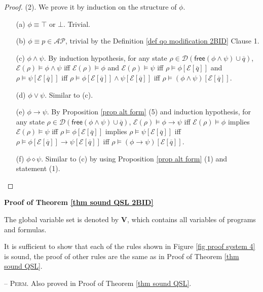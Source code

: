 \documentclass[conference,compsoc, 10pt]{IEEEtran}
\newcommand {\qbar} {{\overline{q}}}
\newcommand {\cD } {{\mathcal{D}}}
\newcommand {\cE } {{\mathcal{E}}}
\newcommand {\free }[1] {{\mathsf{free}\left(#1\right)}}
\newcommand {\vars } {\mathbf{V}}
\newcommand {\AP} {{\mathcal{AP}}}
\newcommand{\sd}{\diamond}%
\begin{document}
\begin{appendices}
\begin{proof}
			\noindent	(2). We prove it by induction on the structure of $\phi$.
			\begin{enumerate}
				\item[(a)] $\phi\equiv\top$ or $\bot$. Trivial.
				\item[(b)] $\phi\equiv p\in\AP$, trivial by the Definition \ref{def qo modification 2BID} Clause 1.
				\item[(c)] $\phi\wedge\psi$. By induction hypothesis, for any state $\rho\in\cD(\free{\phi\wedge\psi}\cup\qbar)$, $\cE(\rho)\models\phi\wedge\psi$ iff $\cE(\rho)\models\phi$ and $\cE(\rho)\models\psi$ iff $\rho\models \phi[\cE[\qbar]]$ and $\rho\models \psi[\cE[\qbar]]$ iff $\rho\models \phi[\cE[\qbar]]\wedge\psi[\cE[\qbar]]$ iff $\rho\models (\phi\wedge\psi)[\cE[\qbar]]$.
				\item[(d)] $\phi\vee\psi$. Similar to (c).
				\item[(e)] $\phi\rightarrow\psi$. By Proposition \ref{prop alt form} (5) and induction hypothesis, for any state $\rho\in\cD(\free{\phi\wedge\psi}\cup\qbar)$, $\cE(\rho)\models\phi\rightarrow\psi$ iff $\cE(\rho)\models\phi$ implies $\cE(\rho)\models\psi$ iff $\rho\models \phi[\cE[\qbar]]$ implies $\rho\models \psi[\cE[\qbar]]$ iff $\rho\models \phi[\cE[\qbar]]\rightarrow\psi[\cE[\qbar]]$ iff $\rho\models (\phi\rightarrow\psi)[\cE[\qbar]]$.
				\item[(f)] $\phi\sd\psi$. Similar to (c) by using Proposition \ref{prop alt form} (1) and statement (1).
			\end{enumerate}
		\end{proof}
		
		
		\vspace{0.5cm}
		
		\noindent\textbf{Proof of Theorem \ref{thm sound QSL 2BID}}
		
		
		The global variable set is denoted by $\vars$, which contains all variables of programs and formulas. 
		
		It is sufficient to show that each of the rules shown in Figure \ref{fig proof system 4} is sound, the proof of other rules are the same as in Proof of Theorem \ref{thm sound QSL}.
		
		\noindent -- \textsc{Perm}. Also proved in Proof of Theorem \ref{thm sound QSL}.
		
		\vspace{0.4cm}
		

\end{appendices}
\end{document}
